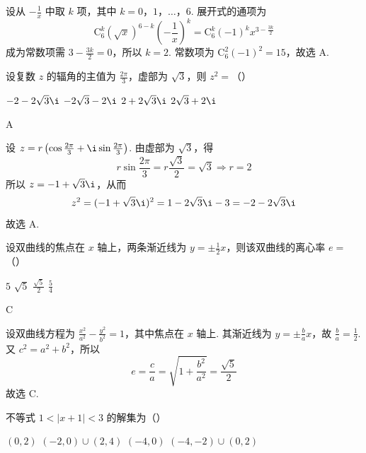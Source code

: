 \begin{solution}
设从 \(-\frac{1}{x}\) 中取 \(k\) 项，其中 \(k=0\)，\(1\)，\(\ldots\)，\(6\). 展开式的通项为
\[
\mathrm C_6^k(\sqrt{x})^{6-k}\left(-\frac{1}{x}\right)^k
=\mathrm C_6^k(-1)^k x^{3-\frac{3k}{2}}
\]
成为常数项需 \(3-\frac{3k}{2}=0\)，所以 \(k=2\). 常数项为 \(\mathrm C_6^2(-1)^2=15\)，故选 A.
\end{solution}

\begin{problem}
设复数 \(z\) 的辐角的主值为 \(\frac{2\pi}{3}\)，虚部为 \(\sqrt{3}\)，则 \(z^2 =\)（\quad）

\choices
    {\(-2 - 2\sqrt{3}\i\)}
    {\(-2\sqrt{3} - 2\i\)}
    {\(2 + 2\sqrt{3}\i\)}
    {\(2\sqrt{3} + 2\i\)}
\end{problem}

\begin{answer}
A
\end{answer}

\begin{solution}
设 \(z=r\left(\cos\frac{2\pi}{3}+\i\sin\frac{2\pi}{3}\right)\). 由虚部为 \(\sqrt{3}\)，得
\[
r\sin\frac{2\pi}{3}=r\frac{\sqrt{3}}{2}=\sqrt{3}\Longrightarrow r=2
\]
所以 \(z=-1+\sqrt{3}\i\)，从而
\[
z^2=(-1+\sqrt{3}\i)^2=1-2\sqrt{3}\i-3=-2-2\sqrt{3}\i
\]
故选 A.
\end{solution}

\begin{problem}
设双曲线的焦点在 \(x\) 轴上，两条渐近线为 \(y = \pm \frac{1}{2} x\)，则该双曲线的离心率 \(e =\)（\quad）

\choices
    {\(5\)}
    {\(\sqrt{5}\)}
    {\(\frac{\sqrt{5}}{2}\)}
    {\(\frac{5}{4}\)}
\end{problem}

\begin{answer}
C
\end{answer}

\begin{solution}
设双曲线方程为 \(\frac{x^2}{a^2}-\frac{y^2}{b^2}=1\)，其中焦点在 \(x\) 轴上. 其渐近线为 \(y=\pm\frac{b}{a}x\)，故 \(\frac{b}{a}=\frac12\). 又 \(c^2=a^2+b^2\)，所以
\[
e=\frac{c}{a}=\sqrt{1+\frac{b^2}{a^2}}=\frac{\sqrt{5}}{2}
\]
故选 C.
\end{solution}

\begin{problem}
不等式 \(1 < |x + 1| < 3\) 的解集为（\quad）

\choices
    {\((0,2)\)}
    {\((-2,0) \cup (2,4)\)}
    {\((-4,0)\)}
    {\((-4, -2) \cup (0, 2)\)}
\end{problem}

